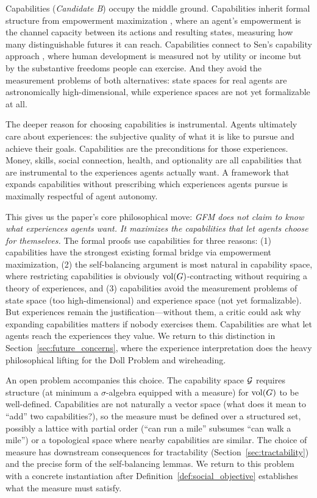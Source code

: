 Capabilities (\emph{Candidate B}) occupy the middle ground. Capabilities
inherit formal structure from empowerment maximization
\citep{klyubin2005empowerment}, where an agent's empowerment is the channel
capacity between its actions and resulting states, measuring how many
distinguishable futures it can reach. Capabilities connect to Sen's capability
approach \citep{sen1999development}, where human development is measured not by
utility or income but by the substantive freedoms people can exercise. And they
avoid the measurement problems of both alternatives: state spaces for real
agents are astronomically high-dimensional, while experience spaces are not yet
formalizable at all.

The deeper reason for choosing capabilities is instrumental. Agents ultimately
care about experiences: the subjective quality of what it is like to pursue and
achieve their goals. Capabilities are the preconditions for those experiences.
Money, skills, social connection, health, and optionality are all capabilities
that are instrumental to the experiences agents actually want. A framework that
expands capabilities without prescribing which experiences agents pursue is
maximally respectful of agent autonomy.

This gives us the paper's core philosophical move: \emph{GFM does not claim to
know what experiences agents want. It maximizes the capabilities that let
agents choose for themselves.} The formal proofs use capabilities for three
reasons: (1) capabilities have the strongest existing formal bridge via
empowerment maximization, (2) the self-balancing argument is most natural in
capability space, where restricting capabilities is obviously
$\operatorname{vol}(G)$-contracting without requiring a theory of experiences, and (3)
capabilities avoid the measurement problems of state space (too
high-dimensional) and experience space (not yet formalizable). But experiences
remain the justification---without them, a critic could ask why expanding
capabilities matters if nobody exercises them. Capabilities are what let agents
reach the experiences they value. We return to this distinction in
Section~\ref{sec:future_concerns}, where the experience interpretation does the
heavy philosophical lifting for the Doll Problem and wireheading.

\medskip

An open problem accompanies this choice. The capability space $\mathcal{G}$ requires
structure (at minimum a $\sigma$-algebra equipped with a measure) for $\operatorname{vol}(G)$
to be well-defined. Capabilities are not naturally a vector space (what does it
mean to ``add'' two capabilities?), so the measure must be defined over a
structured set, possibly a lattice with partial order (``can run a mile''
subsumes ``can walk a mile'') or a topological space where nearby capabilities
are similar. The choice of measure has downstream consequences for tractability
(Section~\ref{sec:tractability}) and the precise form of the self-balancing
lemmas. We return to this problem with a concrete instantiation after
Definition~\ref{def:social_objective} establishes what the measure must
satisfy.


